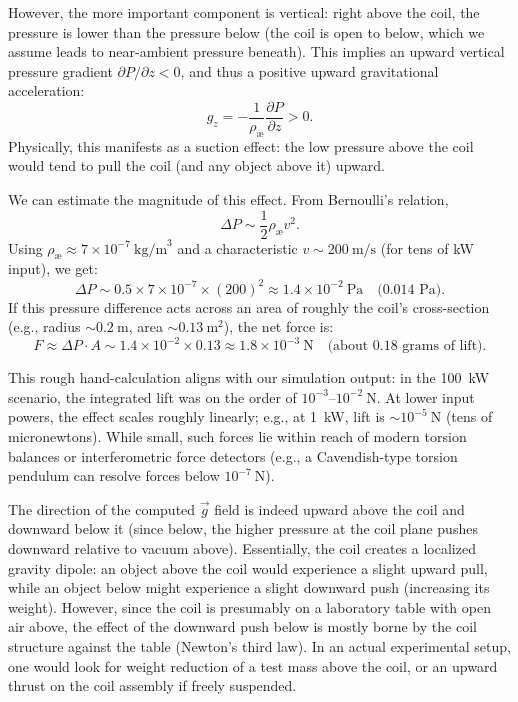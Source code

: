 \documentclass[twocolumn,aps,pre,floatfix,nofootinbib]{revtex4-2}
\begin{document}
However, the more important component is vertical: right above the coil, the pressure is lower than the pressure below (the coil is open to below, which we assume leads to near-ambient pressure beneath). This implies an upward vertical pressure gradient \( \partial P/\partial z < 0 \), and thus a positive upward gravitational acceleration:
\[
    g_z = -\frac{1}{\rho_\text{\ae}} \frac{\partial P}{\partial z} > 0.
\]
Physically, this manifests as a suction effect: the low pressure above the coil would tend to pull the coil (and any object above it) upward.

We can estimate the magnitude of this effect. From Bernoulli’s relation,
\[
    \Delta P \sim \frac{1}{2} \rho_{\text{\ae}} v^2.
\]
Using \( \rho_{\text{\ae}} \approx 7\times10^{-7}~\text{kg/m}^3 \) and a characteristic \( v \sim 200~\text{m/s} \) (for tens of kW input), we get:
\[
    \Delta P \sim 0.5 \times 7\times10^{-7} \times (200)^2 \approx 1.4\times10^{-2}~\text{Pa} \quad \text{(0.014 Pa)}.
\]
If this pressure difference acts across an area of roughly the coil’s cross-section (e.g., radius \( \sim 0.2~\text{m} \), area \( \sim 0.13~\text{m}^2 \)), the net force is:
\[
    F \approx \Delta P \cdot A \sim 1.4\times10^{-2} \times 0.13 \approx 1.8\times10^{-3}~\text{N} \quad \text{(about 0.18 grams of lift)}.
\]

This rough hand-calculation aligns with our simulation output: in the 100~kW scenario, the integrated lift was on the order of \( 10^{-3} \)–\( 10^{-2}~\text{N} \). At lower input powers, the effect scales roughly linearly; e.g., at 1~kW, lift is \( \sim 10^{-5}~\text{N} \) (tens of micronewtons). While small, such forces lie within reach of modern torsion balances or interferometric force detectors (e.g., a Cavendish-type torsion pendulum can resolve forces below \( 10^{-7}~\text{N} \)).


The direction of the computed $\vec{g}$ field is indeed upward above the coil and downward below it (since below, the higher pressure at the coil plane pushes downward relative to vacuum above). Essentially, the coil creates a localized gravity dipole: an object above the coil would experience a slight upward pull, while an object below might experience a slight downward push (increasing its weight). However, since the coil is presumably on a laboratory table with open air above, the effect of the downward push below is mostly borne by the coil structure against the table (Newton’s third law). In an actual experimental setup, one would look for weight reduction of a test mass above the coil, or an upward thrust on the coil assembly if freely suspended.
\end{document}
